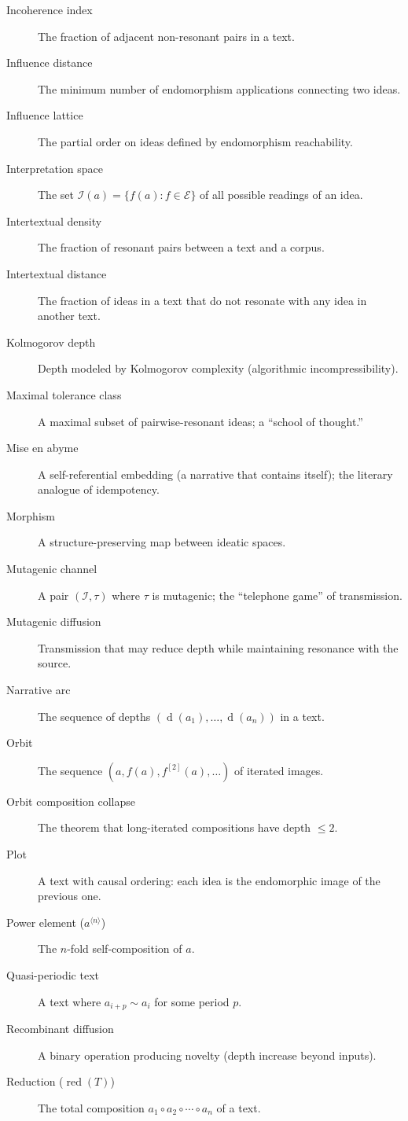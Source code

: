 \documentclass[11pt,openany]{book}
\theoremstyle{definition}
\theoremstyle{plain}
\theoremstyle{remark}
\newcommand{\IS}{\mathcal{I}}               %
\newcommand{\compose}{\circ}                 %
\newcommand{\res}{\sim}                      %
\newcommand{\depth}{\operatorname{d}}       %
\newcommand{\transmit}{\tau}                 %
\newcommand{\compN}[2]{#1^{\langle #2 \rangle}} %
\begin{document}
\begin{description}
\item[Incoherence index] The fraction of adjacent non-resonant pairs in a text.
\item[Influence distance] The minimum number of endomorphism applications connecting two ideas.
\item[Influence lattice] The partial order on ideas defined by endomorphism reachability.
\item[Interpretation space] The set $\mathcal{I}(a) = \{f(a) : f \in \mathcal{E}\}$ of all possible readings of an idea.
\item[Intertextual density] The fraction of resonant pairs between a text and a corpus.
\item[Intertextual distance] The fraction of ideas in a text that do not resonate with any idea in another text.
\item[Kolmogorov depth] Depth modeled by Kolmogorov complexity (algorithmic incompressibility).
\item[Maximal tolerance class] A maximal subset of pairwise-resonant ideas; a ``school of thought.''
\item[Mise en abyme] A self-referential embedding (a narrative that contains itself); the literary analogue of idempotency.
\item[Morphism] A structure-preserving map between ideatic spaces.
\item[Mutagenic channel] A pair $(\IS, \transmit)$ where $\transmit$ is mutagenic; the ``telephone game'' of transmission.
\item[Mutagenic diffusion] Transmission that may reduce depth while maintaining resonance with the source.
\item[Narrative arc] The sequence of depths $(\depth(a_1), \ldots, \depth(a_n))$ in a text.
\item[Orbit] The sequence $(a, f(a), f^{[2]}(a), \ldots)$ of iterated images.
\item[Orbit composition collapse] The theorem that long-iterated compositions have depth $\leq 2$.
\item[Plot] A text with causal ordering: each idea is the endomorphic image of the previous one.
\item[Power element ($\compN{a}{n}$)] The $n$-fold self-composition of $a$.
\item[Quasi-periodic text] A text where $a_{i+p} \res a_i$ for some period $p$.
\item[Recombinant diffusion] A binary operation producing novelty (depth increase beyond inputs).
\item[Reduction ($\operatorname{red}(T)$)] The total composition $a_1 \compose a_2 \compose \cdots \compose a_n$ of a text.

\end{description}
\end{document}
